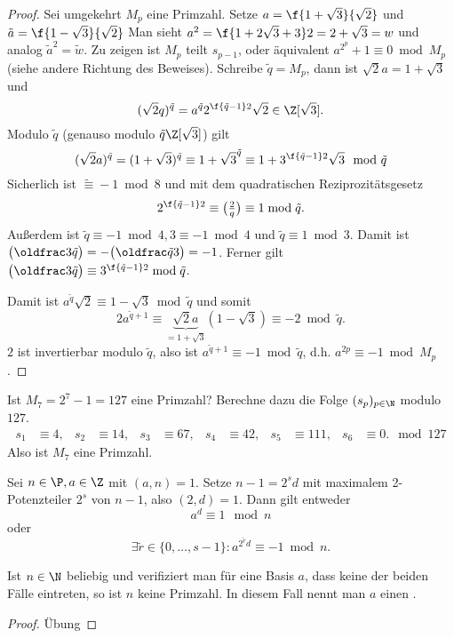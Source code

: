 \begin{st}
\begin{proof}
		Sei umgekehrt $M_p$ eine Primzahl.
		Setze $a = \f{1 + \sqrt{3}}{\sqrt{2}}$ und $\tilde a = \f{1 - \sqrt{3}}{\sqrt{2}}$
		Man sieht $a^2 = \f{1 + 2\sqrt{3} + 3}2 = 2 + \sqrt{3} = w$ und analog $\tilde a^2 = \tilde w$.
		Zu zeigen ist $M_p$ teilt $s_{p-1}$, oder äquivalent $a^{2^p} + 1 \equiv 0 \bmod M_p$ (siehe andere Richtung des Beweises).
		Schreibe $\tilde q = M_p$, dann ist $\sqrt{2} a = 1 + \sqrt{3}$ und
		\[
			(\sqrt{2} q)^{\tilde q} = a^{\tilde q} 2^{\f{\tilde q - 1}2} \sqrt{2}
			\in \Z[\sqrt{3}].
		\]
		Modulo $\tilde q$ (genauso modulo $\tilde q \Z[\sqrt{3}]$) gilt
		\[
			(\sqrt 2 a)^{\tilde q}
			= (1 + \sqrt 3)^{\tilde q}
			\equiv 1 + \sqrt{3}^{\tilde q}
			\equiv 1 + 3^{\f{\tilde q -1}2} \sqrt{3}
			\mod \tilde q
		\]
		Sicherlich ist $\tilde \equiv -1 \bmod 8$ und mit dem quadratischen Reziprozitätsgesetz
		\[
			2^{\f{\tilde q - 1}2} \equiv \legsym{2}{q}
			\equiv 1 \bmod \tilde q.
		\]
		Außerdem ist $\tilde q \equiv -1 \bmod 4, 3 \equiv -1 \bmod 4$ und $\tilde q \equiv 1 \bmod 3$.
		Damit ist $\legsym{3}{\tilde q} = - \legsym{\tilde q}{3} = -1$.
		Ferner gilt $\legsym{3}{\tilde q} \equiv 3^{\f{\tilde q-1}2} \bmod \tilde q$.

		Damit ist $a^{\tilde q} \sqrt{2} \equiv 1 - \sqrt{3} \bmod \tilde q$ und somit
		\[
			2 a^{\tilde q + 1}
			\equiv \underbrace{\sqrt{2} a}_{=1+\sqrt{3}} (1 - \sqrt{3})
			\equiv -2 \bmod \tilde q.
		\]
		$2$ ist invertierbar modulo $\tilde q$, also ist $a^{\tilde q + 1} \equiv -1 \bmod \tilde q$, d.h. $a^{2p} \equiv -1 \bmod M_p$.
	\end{proof}
\end{st}

\begin{ex} \label{3.18}
	Ist $M_7 = 2^7 - 1 = 127$ eine Primzahl?
	Berechne dazu die Folge $(s_p)_{p\in \N}$ modulo $127$.
	\begin{align*}
		s_1 &\equiv 4, &
		s_2 &\equiv 14, &
		s_3 &\equiv 67, &
		s_4 &\equiv 42, &
		s_5 &\equiv 111, &
		s_6 &\equiv 0.
		\mod 127
	\end{align*}
	Also ist $M_7$ eine Primzahl.
\end{ex}

\begin{prop} \label{3.19}
	Sei $n \in \P, a \in \Z$ mit $(a, n) = 1$.
	Setze $n - 1 = 2^s d$ mit maximalem 2-Potenzteiler $2^s$ von $n-1$, also $(2, d) = 1$.
	Dann gilt entweder
	\[
		a^d \equiv 1 \mod n
	\]
	oder
	\[
		\exists \tilde r \in \{0, \dotsc, s-1\} :
		a^{2^{\tilde r} d} \equiv -1 \bmod n.
	\]
	\begin{note}
		Ist $n \in \N$ beliebig und verifiziert man für eine Basis $a$, dass keine der beiden Fälle eintreten, so ist $n$ keine Primzahl.
		In diesem Fall nennt man $a$ einen .
	\end{note}
	\begin{proof}
		Übung
	\end{proof}
\end{prop}

